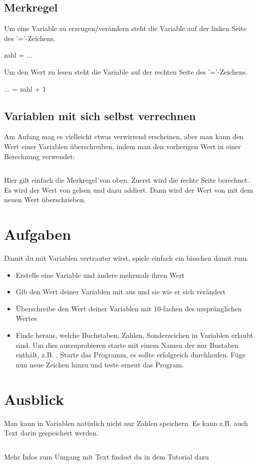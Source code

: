 \documentclass{\VorlagenPfad/coderdojokatext}
\begin{document}
\subsection{Merkregel}
\begin{merkbox}
	Um eine Variable zu erzeugen/verändern steht die Variable auf der linken Seite des '='-Zeichens.
\begin{pythoncode}
zahl = ...
\end{pythoncode}
Um den Wert zu lesen steht die Variable auf der rechten Seite des '='-Zeichens.
\begin{pythoncode}
... = zahl + 1
\end{pythoncode}

\end{merkbox}

\subsection{Variablen mit sich selbst verrechnen}
Am Anfang mag es vielleicht etwas verwirrend erscheinen, aber man kann den Wert einer Variablen überschreiben, indem man den vorherigen Wert in einer Berechnung verwendet:

\inputminted[firstline=23, lastline=26]{python}{../../../Beispiele/variablen.py}
Hier gilt einfach die Merkregel von oben. Zuerst wird die rechte Seite berechnet. Es wird der Wert von  gelsen und  dazu addiert. Dann wird der Wert von  mit dem neuen Wert überschrieben.

\section{Aufgaben}
Damit du mit Variablen vertrauter wirst, spiele einfach ein bisschen damit rum.
\begin{itemize}
	\item Erstelle eine Variable und ändere mehrmals ihren Wert
	\item Gib den Wert deiner Variablen mit  aus und sie wie er sich verändert
	\item Überschreibe den Wert deiner Variablen mit 10-fachen des ursprünglichen Wertes
	\item Finde heraus, welche Buchstaben, Zahlen, Sonderzeichen in Variablen erlaubt sind. Um dies auszuprobieren starte mit einem Namen der nur Bustaben enthält, z.B. . Starte das Programm, es sollte erfolgreich durchlaufen. Füge nun neue Zeichen hinzu und teste erneut das Program. 
\end{itemize}

\section{Ausblick}
Man kann in Variablen natürlich nicht nur Zahlen speichern. Es kann z.B. auch Text darin gespeichert werden.
\inputminted[firstline=28, lastline=31]{python}{../../../Beispiele/variablen.py}
Mehr Infos zum Umgang mit Text findest du in dem Tutorial dazu
\end{document}
